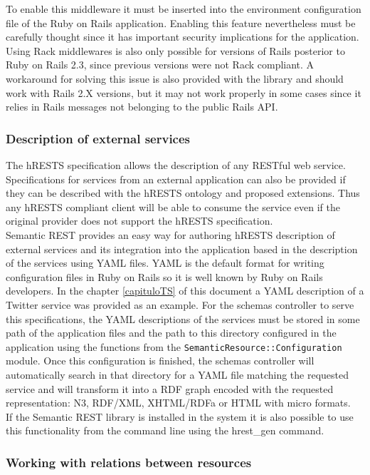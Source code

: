 To enable this middleware it must be inserted into the environment configuration file of the Ruby on Rails
application. Enabling this feature nevertheless must be carefully thought since it has important security implications
for the application. Using Rack middlewares is also only possible for versions of Rails posterior to Ruby on Rails 2.3,
since previous versions were not Rack compliant. A workaround for solving this issue is also provided with the library
and should work with Rails 2.X versions, but it may not work properly in some cases since it relies in Rails messages
not belonging to the public Rails API.

\subsubsection{Description of external services}\label{desc_ext_servs}

The hRESTS specification allows the description of any RESTful web service. Specifications for services from an external
application can also be provided if they can be described with the
hRESTS ontology and proposed extensions. Thus any hRESTS compliant client will be able to consume the service even if the original
provider does not support the hRESTS specification.\\
Semantic REST provides an easy way for authoring hRESTS description of external services and its integration into the
application based in the description of the services using YAML files. YAML is the default format for writing configuration
files in Ruby on Rails so it is well known by Ruby on Rails developers. In the chapter \ref{capituloTS} of this document
a YAML description of a Twitter service was provided as an example. For the schemas controller to serve this
specifications, the YAML descriptions of the services must be stored in some path of the application files and the path
to this directory configured in the application using the functions from the \texttt{SemanticResource::Configuration}
module. Once this configuration is finished, the schemas controller will automatically search in that directory for a
YAML file matching the requested service and will transform it into a RDF graph encoded with the requested representation:
N3, RDF/XML, XHTML/RDFa or HTML with micro formats.\\
If the Semantic REST library is installed in the system it is also possible to use this functionality from the command
line using the hrest\_gen command.

\subsubsection{Working with relations between resources}

